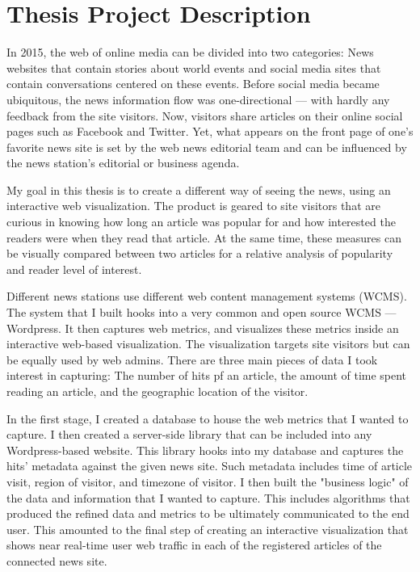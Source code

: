 \documentclass[12pt]{article}
\begin{document}
\begin{singlespace}
\tableofcontents
\end{singlespace}

\vfill

\section{Thesis Project Description}
In 2015, the web of online media can be divided into two categories: News websites that contain stories about world events and social media sites that contain conversations centered on these events. Before social media became ubiquitous, the news information flow was one-directional ---  with hardly any feedback from the site visitors. Now, visitors share articles on their online social pages such as Facebook and Twitter. Yet, what appears on the front page of one's favorite news site is set by the web news editorial team and can be influenced by the news station's editorial or business agenda. 

My goal in this thesis is to create a different way of seeing the news, using an interactive web visualization. The product is geared to site visitors that are curious in knowing how long an article was popular for and how interested the readers were when they read that article. At the same time, these measures can be visually compared between two articles for a relative analysis of popularity and reader level of interest. 

Different news stations use different web content management systems (WCMS). The system that I built hooks into a very common and open source WCMS --- Wordpress. It then captures web metrics, and visualizes these metrics inside an interactive web-based visualization. The visualization targets site visitors but can be equally used by web admins. There are three main pieces of data I took interest in capturing: The number of hits pf an article, the amount of time spent reading an article, and the geographic location of the visitor. 

In the first stage, I created a database to house the web metrics that I wanted to capture. I then created a server-side library that can be included into any Wordpress-based website. This library hooks into my database and captures the hits' metadata against the given news site. Such metadata includes time of article visit, region of visitor, and timezone of visitor.  
I then built the "business logic" of the data and information that I wanted to capture. This includes algorithms that produced the refined data and metrics to be ultimately communicated to the end user.
This amounted to the final step of creating an interactive visualization that shows near real-time user web traffic in each of the registered articles of the connected news site.
\end{document}
